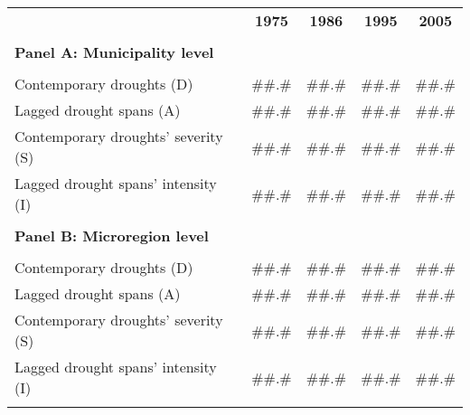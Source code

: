 \begin{tabular}{rcccc}
\toprule
      & \textbf{1975} & \textbf{1986} & \textbf{1995} & \textbf{2005} \\
\cmidrule{2-5}      &       &       &       &  \\
\multicolumn{1}{l}{\textbf{Panel A: Municipality level}} &       &       &       &  \\
      &       &       &       &  \\
\multicolumn{1}{l}{Contemporary droughts (D)} & \#\#.\# & \#\#.\# & \#\#.\# & \#\#.\# \\
\multicolumn{1}{l}{Lagged drought spans (A)} & \#\#.\# & \#\#.\# & \#\#.\# & \#\#.\# \\
\multicolumn{1}{l}{Contemporary droughts' severity (S)} & \#\#.\# & \#\#.\# & \#\#.\# & \#\#.\# \\
\multicolumn{1}{l}{Lagged drought spans' intensity (I)} & \#\#.\# & \#\#.\# & \#\#.\# & \#\#.\# \\
      &       &       &       &  \\
\multicolumn{1}{l}{\textbf{Panel B: Microregion level}} &       &       &       &  \\
      &       &       &       &  \\
\multicolumn{1}{l}{Contemporary droughts (D)} & \#\#.\# & \#\#.\# & \#\#.\# & \#\#.\# \\
\multicolumn{1}{l}{Lagged drought spans (A)} & \#\#.\# & \#\#.\# & \#\#.\# & \#\#.\# \\
\multicolumn{1}{l}{Contemporary droughts' severity (S)} & \#\#.\# & \#\#.\# & \#\#.\# & \#\#.\# \\
\multicolumn{1}{l}{Lagged drought spans' intensity (I)} & \#\#.\# & \#\#.\# & \#\#.\# & \#\#.\# \\
      &       &       &       &  \\
\bottomrule
\end{tabular}%
